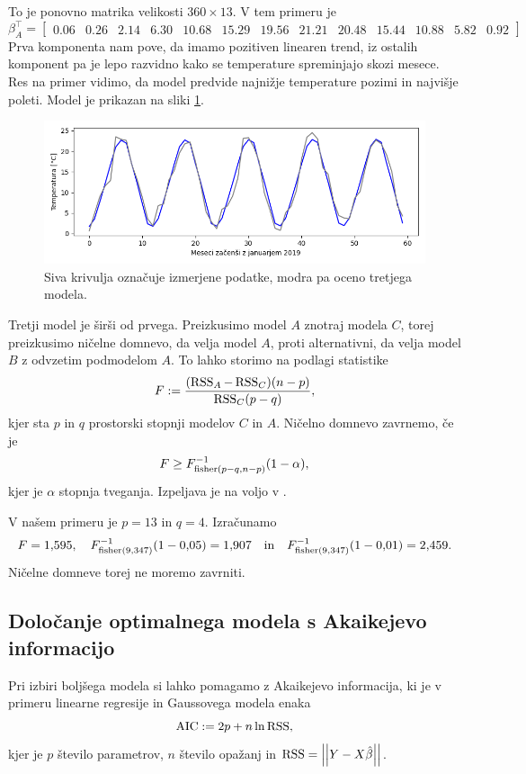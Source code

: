\documentclass[12pt, a4paper]{article}
\begin{document}
To je ponovno matrika velikosti $360 \times 13$. V tem primeru je
\footnotesize
\[
    \beta_A^\top = \begin{bmatrix}
        0.06 & 0.26 & 2.14 & 6.30 & 10.68 & 15.29 & 
        19.56 & 21.21 & 20.48 & 15.44 & 10.88 & 5.82 & 0.92
    \end{bmatrix}
\]
\normalsize
Prva komponenta nam pove, da imamo pozitiven linearen trend, 
iz ostalih komponent pa je lepo razvidno kako se temperature
spreminjajo skozi mesece. Res na primer vidimo, da model 
predvide najnižje temperature pozimi in najvišje poleti.
Model je prikazan na sliki \ref{png:tretji}.
\begin{figure}[H]
    \centering
    \includegraphics[width=14cm]{Slike/tretji_model.png}
    \caption{Siva krivulja označuje izmerjene podatke, modra pa oceno 
    tretjega modela.}
    \label{png:tretji}
\end{figure}
Tretji model je širši od prvega. Preizkusimo model $A$ znotraj 
modela $C$, torej preizkusimo ničelne domnevo, da velja model $A$, 
proti alternativni, da velja model $B$ z odvzetim podmodelom $A$.
To lahko storimo na podlagi statistike
\[
    F := \frac{(\operatorname{RSS}_A - \operatorname{RSS}_C)(n-p)}{\operatorname{RSS}_C (p-q)},
\]
kjer sta $p$ in $q$ prostorski stopnji modelov $C$ in $A$. 
Ničelno domnevo zavrnemo, če je 
\[
    F \ge F^{-1}_{\operatorname{fisher}(p-q,n-p)}(1-\alpha),
\]
kjer je $\alpha$ stopnja tveganja. 
Izpeljava je na voljo v \cite{raic2}. 

V našem primeru je $p = 13$ in $q = 4$. Izračunamo 
\[
    F = 1{,}595, \quad
    F^{-1}_{\operatorname{fisher}(9,347)}(1-0{,}05) = 1{,}907 \quad \text{in} \quad
    F^{-1}_{\operatorname{fisher}(9,347)}(1-0{,}01) = 2{,}459.
\]
Ničelne domneve torej ne moremo zavrniti.

\subsection*{Določanje optimalnega modela s Akaikejevo informacijo}

Pri izbiri boljšega modela si lahko pomagamo z Akaikejevo informacija, 
ki je v primeru linearne regresije in Gaussovega modela enaka
\[
    \operatorname{AIC} := 2p + n \ln \operatorname{RSS},
\]
kjer je $p$ število parametrov, $n$ število opažanj in $\operatorname{RSS} = \left\lvert\left\lvert Y - X\hat \beta\right\rvert\right\rvert$.
\end{document}
